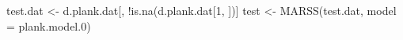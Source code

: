 \begin{Schunk}
\begin{Sinput}
 test.dat <- d.plank.dat[, !is.na(d.plank.dat[1, ])]
 test <- MARSS(test.dat, model = plank.model.0)
\end{Sinput}
\end{Schunk}
